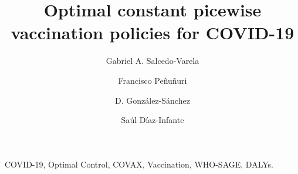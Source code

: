 \begin{frontmatter}
    \title{Optimal constant picewise vaccination policies for COVID-19}
    \author[add:unison]%
    {Gabriel A. Salcedo-Varela}
    \address[add:unison]{
        Departamento de Matem\'aticas, Universidad de Sonora,
        Blvd. Luis Encinas y Rosales S/N,
        Hermosillo, Sonora, M\'exico, C.P. 83000.
    }
    \author[add:UADY]%
    {Francisco Pe\~nu\~nuri}
    \address[add:UADY]{Facultad de Ingenier\'ia, Universidad 
    Aut\'onoma de Yucat\'an, A.P. 150, Cordemex, M\'erida, Yucat\'an, 
    M\'exico.}
    \author[add:conacyt_unison]{D. Gonz\'alez-S\'anchez}
        \address[add:conacyt_unison]{
        CONACYT-Universidad de Sonora,
        Departamento de Matem\'aticas,
        Blvd. Luis Encinas y Rosales S/N,
        Hermosillo, Sonora, M\'exico, C.P. 83000.
    }
    \author[add:conacyt_unison]{%
        Sa\'ul D\'iaz-Infante%
    }%
    
    \begin{keyword}
        COVID-19, Optimal Control, COVAX,
        Vaccination, WHO-SAGE, DALYs.
    \end{keyword}
\end{frontmatter}